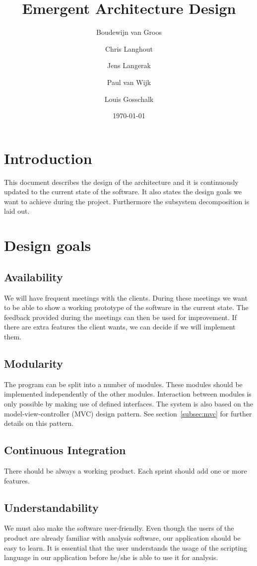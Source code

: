 \documentclass[a4paper]{article}
\title{Emergent Architecture Design}
\author[1]{Boudewijn van Groos}
\author[2]{Chris Langhout}
\author[3]{Jens Langerak}
\author[4]{Paul van Wijk}
\author[5]{Louis Gosschalk}
\affil[1]{bvangroos \\
4229843}
\affil[2]{clanghout \\
4281705}
\affil[3]{jlangerak \\
4317327}
\affil[4]{pjvanwijk \\
4285034}
\affil[5]{lgosschalk \\
4214528}
\date{\today}
\begin{document}
\maketitle
\tableofcontents
\newpage

\section{Introduction}
This document describes the design of the architecture and it is continuously updated to the current state of the software. It also states the design goals we want to achieve during the project. Furthermore the subsystem decomposition is laid out.

\section{Design goals}

\subsection{Availability}
We will have frequent meetings with the clients. During these meetings we want to be able to show a working prototype of the software in the current state. The feedback provided during the meetings can then be used for improvement. If there are extra features the client wants, we can decide if we will implement them.

\subsection{Modularity}
The program can be split into a number of modules. These modules should be implemented independently of the other modules. Interaction between modules is only possible by making use of defined interfaces. The system is also based on the model-view-controller (MVC) design pattern. See section~\ref{subsec:mvc} for further details on this pattern.

\subsection{Continuous Integration}
There should be always a working product. Each sprint should add one or more features.

\subsection{Understandability}
We must also make the software user-friendly. Even though the users of the
product are already familiar with analysis software, our application should be
easy to learn. It is essential that the user understands the usage of the
scripting language in our application before he/she is able to use it for
analysis.
\end{document}
